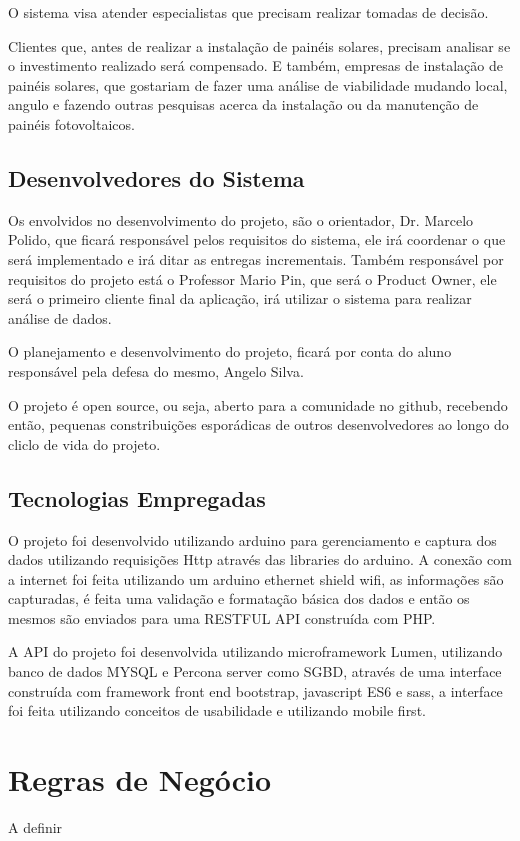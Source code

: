 O sistema visa atender especialistas que precisam realizar tomadas de decisão.

Clientes que, antes de realizar a instalação de painéis solares, precisam analisar se o investimento realizado será compensado. E também, empresas de instalação de painéis solares, que gostariam de fazer uma análise de viabilidade mudando local, angulo e fazendo outras pesquisas acerca da instalação ou da manutenção de painéis fotovoltaicos.

\subsection{Desenvolvedores do Sistema}

Os envolvidos no desenvolvimento do projeto, são o orientador, Dr. Marcelo Polido, que ficará responsável pelos requisitos do sistema, ele irá coordenar o que será implementado e irá ditar as entregas incrementais. Também responsável por requisitos do projeto está o Professor Mario Pin, que será o Product Owner, ele será o primeiro cliente final da aplicação, irá utilizar o sistema para realizar análise de dados.

O planejamento e desenvolvimento do projeto, ficará por conta do aluno responsável pela defesa do mesmo, Angelo Silva.

O projeto é open source, ou seja, aberto para a comunidade no github, recebendo então, pequenas constribuições esporádicas de outros desenvolvedores ao longo do cliclo de vida do projeto.

\subsection{Tecnologias Empregadas}

O projeto foi desenvolvido utilizando arduino para gerenciamento e captura dos dados utilizando requisições Http através das libraries do arduino. A conexão com a internet foi feita utilizando um arduino ethernet shield wifi, as informações são capturadas, é feita uma validação e formatação básica dos dados e então os mesmos são enviados para uma RESTFUL API construída com PHP.

A API do projeto foi desenvolvida utilizando microframework Lumen, utilizando banco de dados MYSQL e Percona server como SGBD, através de uma interface construída com framework front end bootstrap, javascript ES6 e sass, a interface foi feita utilizando conceitos de usabilidade e utilizando mobile first.

\section{Regras de Negócio}

A definir
